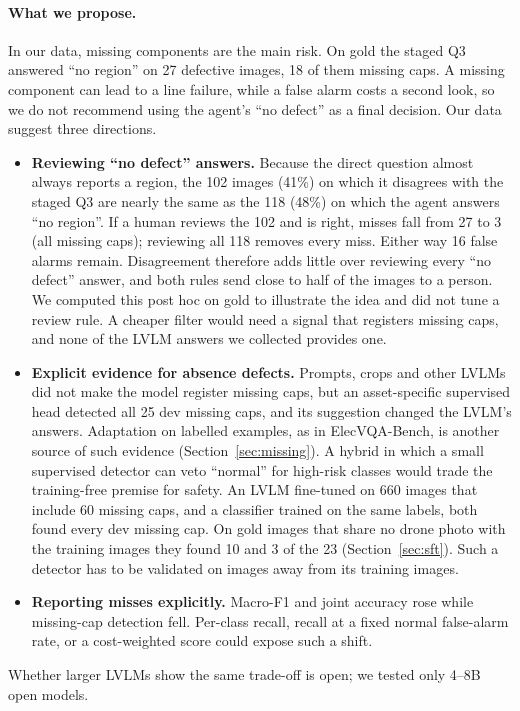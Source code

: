 \documentclass[11pt]{article}
\begin{document}
\paragraph{What we propose.} In our data, missing components are the main risk. On gold the staged Q3 answered ``no region'' on 27 defective images, 18 of them missing caps. A missing component can lead to a line failure, while a false alarm costs a second look, so we do not recommend using the agent's ``no defect'' as a final decision. Our data suggest three directions.
\begin{itemize}
  \item \textbf{Reviewing ``no defect'' answers.} Because the direct question almost always reports a region, the 102 images (41\%) on which it disagrees with the staged Q3 are nearly the same as the 118 (48\%) on which the agent answers ``no region''. If a human reviews the 102 and is right, misses fall from 27 to 3 (all missing caps); reviewing all 118 removes every miss. Either way 16 false alarms remain. Disagreement therefore adds little over reviewing every ``no defect'' answer, and both rules send close to half of the images to a person. We computed this post hoc on gold to illustrate the idea and did not tune a review rule. A cheaper filter would need a signal that registers missing caps, and none of the LVLM answers we collected provides one.
  \item \textbf{Explicit evidence for absence defects.} Prompts, crops and other LVLMs did not make the model register missing caps, but an asset-specific supervised head detected all 25 dev missing caps, and its suggestion changed the LVLM's answers. Adaptation on labelled examples, as in ElecVQA-Bench, is another source of such evidence (Section~\ref{sec:missing}). A hybrid in which a small supervised detector can veto ``normal'' for high-risk classes would trade the training-free premise for safety. An LVLM fine-tuned on 660 images that include 60 missing caps, and a classifier trained on the same labels, both found every dev missing cap. On gold images that share no drone photo with the training images they found 10 and 3 of the 23 (Section~\ref{sec:sft}). Such a detector has to be validated on images away from its training images.
  \item \textbf{Reporting misses explicitly.} Macro-F1 and joint accuracy rose while missing-cap detection fell. Per-class recall, recall at a fixed normal false-alarm rate, or a cost-weighted score could expose such a shift.
\end{itemize}
Whether larger LVLMs show the same trade-off is open; we tested only 4--8B open models.
\end{document}
